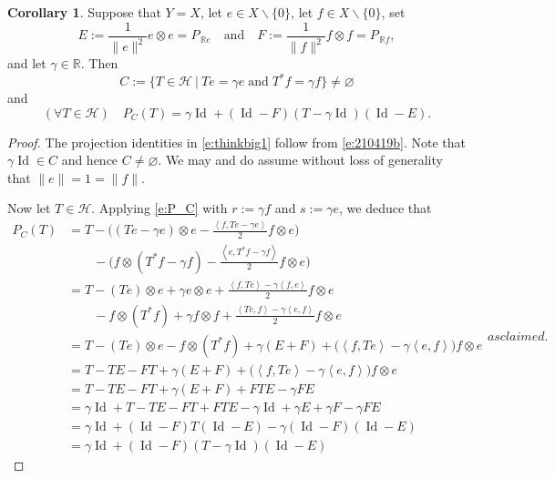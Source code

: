 \documentclass[12pt]{article}
\newcommand{\menge}[2]{\big\{{#1}~\big |~{#2}\big\}}
\newcommand{\scal}[2]{\left\langle{#1},{#2}  \right\rangle}
\newcommand{\RR}{\ensuremath{\mathbb R}}
\newcommand{\Id}{\ensuremath{\operatorname{Id}}}
\theoremstyle{definition}
\newtheorem{corollary}[theorem]{Corollary}
\providecommand{\RR}{\mathbb{R}}
\providecommand{\Id}{\operatorname{{ Id}}}
\providecommand{\Id}{\operatorname{Id}}
\providecommand{\RR}{\mathbb{R}}
\providecommand{\mH}{\mathcal{H}}
\begin{document}
{\begin{corollary}
\label{c:thinkbig}
Suppose that $Y=X$, let $e\in X\smallsetminus\{0\}$, 
let $f\in X\smallsetminus\{0\}$, 
set 
\begin{equation}
\label{e:thinkbig1}
E:= \frac{1}{\|e\|^{2}}e\otimes e = P_{\,\RR e}
\quad\text{and}\quad
F:= \frac{1}{\|f\|^{2}}f\otimes f = P_{\,\RR f}, 
\end{equation}
and let $\gamma\in\RR$. 
Then 
\begin{equation}
C := \menge{T\in\mH}{Te=\gamma e\;\text{and}\;T^* f=\gamma f}
\neq\varnothing
\end{equation}
and 
\begin{equation}
(\forall T\in\mH)\quad P_C(T) = 
\gamma\Id+(\Id-F)(T-\gamma\Id)(\Id-E). 
\end{equation}
\end{corollary}
\begin{proof}
The projection identities in \cref{e:thinkbig1}
follow from \cref{e:210419b}.
Note that $\gamma\Id \in C$ 
and hence $C\neq\varnothing$.
We may and do assume without loss of generality 
that $\|e\|=1=\|f\|$.

Now let $T\in\mH$. 
Applying \cref{e:P_C} 
with $r:=\gamma f$ and $s:=\gamma e$, 
we deduce that 
\begin{subequations}
\begin{align}
P_C(T)
&= 
T  - 
\Big( 
(Te-\gamma e)\otimes e
-\frac{\scal{f}{Te-\gamma e}}{2}f\otimes e
\Big)\\
&\qquad 
-\Big( 
f\otimes (T^*f-\gamma f)
-\frac{\scal{e}{T^*f-\gamma f}}{2}
f\otimes e  \Big)\\
&=
T-(Te)\otimes e + \gamma e\otimes e
+\frac{\scal{f}{Te}-\gamma\scal{f}{e}}{2}f\otimes e\\
&\qquad 
- f\otimes (T^*f) + \gamma f\otimes f 
+ \frac{\scal{Te}{f}-\gamma\scal{e}{f}}{2}f\otimes e\\
&=
T - (Te)\otimes e - f\otimes (T^*f)
+\gamma(E+F)
+\big(\scal{f}{Te}-\gamma\scal{e}{f}\big)f\otimes e\\
&= T - TE - FT + \gamma(E+F)
+\big(\scal{f}{Te}-\gamma\scal{e}{f}\big)f\otimes e\\
&=T-TE-FT+\gamma(E+F) +FTE -\gamma FE\\
&=\gamma\Id +T-TE-FT+FTE-\gamma\Id+\gamma E+\gamma F-\gamma FE\\
&=\gamma\Id + (\Id-F)T(\Id-E)-\gamma(\Id-F)(\Id-E)\\
&= \gamma\Id + (\Id-F)(T-\gamma\Id)(\Id-E)
\end{align}
as claimed.
\end{subequations}
\end{proof}


}
\end{document}
